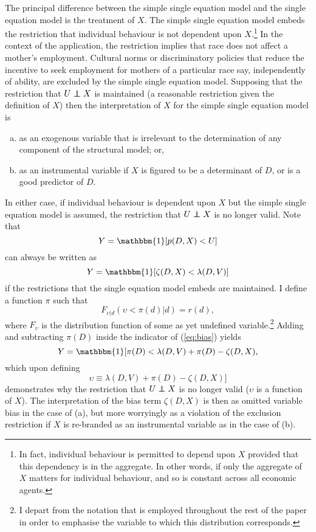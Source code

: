 \documentclass[12pt,a4paper,twoside]{article}
\newcommand\independent{\protect\mathpalette{\protect\independenT}{\perp}}
\def\independenT#1#2{\mathrel{\rlap{$#1#2$}\mkern2mu{#1#2}}}
\numberwithin{equation}{section}
\begin{document}
The principal difference between the simple single equation model and the single equation model is the treatment of $X$. The simple single equation model embeds the restriction that individual behaviour is not dependent upon $X$.\footnote{In fact, individual behaviour is permitted to depend upon $X$ provided that this dependency is in the aggregate. In other words, if only the aggregate of $X$ matters for individual behaviour, and so is constant across all economic agents.} In the context of the application, the restriction implies that race does not affect a mother's employment. Cultural norms or discriminatory policies that reduce the incentive to seek employment for mothers of a particular race say, independently of ability, are excluded by the simple single equation model. Supposing that the restriction that $U\independent X$ is maintained (a reasonable restriction given the definition of $X$) then the interpretation of $X$ for the simple single equation model is 
\begin{enumerate}[(a)]
\item as an exogenous variable that is irrelevant to the determination of any component of the structural model; or,
\item as an instrumental variable if $X$ is figured to be a determinant of $D$, or is a good predictor of $D$.
\end{enumerate}   
In either case, if individual behaviour is dependent upon $X$ but the simple single equation model is assumed, the restriction that $U\independent X$ is no longer valid. Note that
\[Y=\mathbbm{1}[p(D,X)<U]\]
can always be written as
\begin{equation}
Y=\mathbbm{1}[\zeta(D,X)<\lambda(D,V)]\label{eq:bias}
\end{equation}
if the restrictions that the single equation model embeds are maintained. I define a function $\pi$ such that
\[F_{\upsilon|d}(\upsilon<\pi(d)|d)=r(d),\] 
where $F_\upsilon$ is the distribution function of some as yet undefined variable.\footnote{I depart from the notation that is employed throughout the rest of the paper in order to emphasise the variable to which this distribution corresponds.} Adding and subtracting $\pi(D)$ inside the indicator of (\ref{eq:bias}) yields
\[Y=\mathbbm{1}[\pi(D)<\lambda(D,V)+\pi(D)-\zeta(D,X),\]
which upon defining 
\[\upsilon\equiv\lambda(D,V)+\pi(D)-\zeta(D,X)]\]
demonstrates why the restriction that $U\independent X$ is no longer valid ($\upsilon$ is a function of $X$). The interpretation of the bias term $\zeta(D,X)$ is then as omitted variable bias in the case of (a), but more worryingly as a violation of the exclusion restriction if $X$ is re-branded as an instrumental variable as in the case of (b). 
\end{document}
